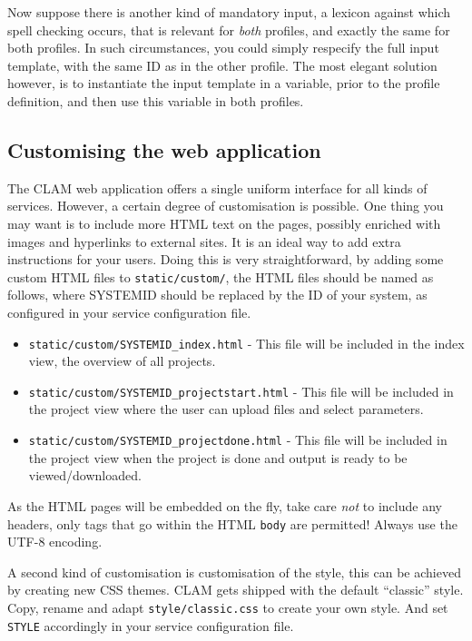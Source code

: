 \documentclass[a4paper,12pt]{report}
\begin{document}
Now suppose there is another kind of mandatory input, a lexicon against which spell checking occurs, that is relevant for \emph{both} profiles, and exactly the same for both profiles. In such circumstances, you could simply respecify the full input template, with the same ID as in the other profile. The most elegant solution however, is to instantiate the input template in a variable, prior to the profile definition, and then use this variable in both profiles.

\subsection{Customising the web application}

The CLAM web application offers a single uniform interface for all kinds of services. However, a certain degree of customisation is possible. One thing you may want is to include more HTML text on the pages, possibly enriched with images and hyperlinks to external sites. It is an ideal way to add extra instructions for your users. Doing this is very straightforward, by adding some custom HTML files to \texttt{static/custom/}, the HTML files should be named as follows, where SYSTEMID should be replaced by the ID of your system, as configured in your service configuration file.

\begin{itemize}
\item \texttt{static/custom/SYSTEMID\_index.html} - This file will be included in the index view, the overview of all projects.
\item \texttt{static/custom/SYSTEMID\_projectstart.html} - This file will be included in the project view where the user can upload files and select parameters.
\item \texttt{static/custom/SYSTEMID\_projectdone.html} - This file will be included in the project view when the project is done and output is ready to be viewed/downloaded.
\end{itemize}

As the HTML pages will be embedded on the fly, take care \emph{not} to include any headers, only tags that go within the HTML \texttt{body} are permitted! Always use the UTF-8 encoding.

A second kind of customisation is customisation of the style, this can be achieved by creating new CSS themes. CLAM gets shipped with the default ``classic'' style. Copy, rename and adapt \texttt{style/classic.css} to create your own style. And set \texttt{STYLE} accordingly in your service configuration file.
\end{document}
